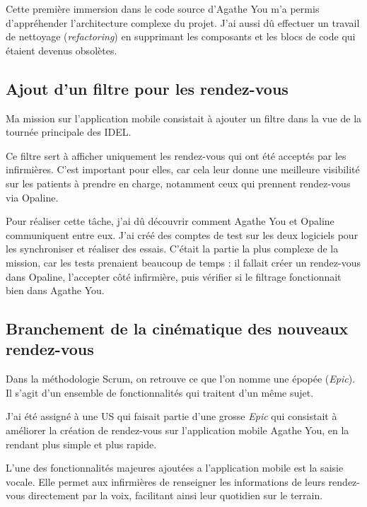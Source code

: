 \documentclass{article}
\begin{document}
Cette première immersion dans le code source d'Agathe You m'a permis d'appréhender l'architecture complexe du projet. J'ai aussi dû effectuer un travail de nettoyage (\textit{refactoring}) en supprimant les composants et les blocs de code qui étaient devenus obsolètes.


\newpage

\subsection{Ajout d'un filtre pour les rendez-vous}

Ma mission sur l'application mobile consistait à ajouter un filtre dans la vue de la tournée principale des IDEL.

Ce filtre sert à afficher uniquement les rendez-vous qui ont été acceptés par les infirmières. C'est important pour elles, car cela leur donne une meilleure visibilité sur les patients à prendre en charge, notamment ceux qui prennent rendez-vous via Opaline.

Pour réaliser cette tâche, j'ai dû découvrir comment Agathe You et Opaline communiquent entre eux. J'ai créé des comptes de test sur les deux logiciels pour les synchroniser et réaliser des essais. C'était la partie la plus complexe de la mission, car les tests prenaient beaucoup de temps : il fallait créer un rendez-vous dans Opaline, l'accepter côté infirmière, puis vérifier si le filtrage fonctionnait bien dans Agathe You.

\subsection{Branchement de la cinématique des nouveaux rendez-vous}

Dans la méthodologie Scrum, on retrouve ce que l'on nomme une épopée (\textit{Epic}). Il s'agit d'un ensemble de fonctionnalités qui traitent d'un même sujet.

J'ai été assigné à une US qui faisait partie d'une grosse \textit{Epic} qui consistait à améliorer la création de rendez-vous sur l'application mobile Agathe You, en la rendant plus simple et plus rapide.

L'une des fonctionnalités majeures ajoutées a l'application mobile est la saisie vocale. Elle permet aux infirmières de renseigner les informations de leurs rendez-vous directement par la voix, facilitant ainsi leur quotidien sur le terrain.
\end{document}
